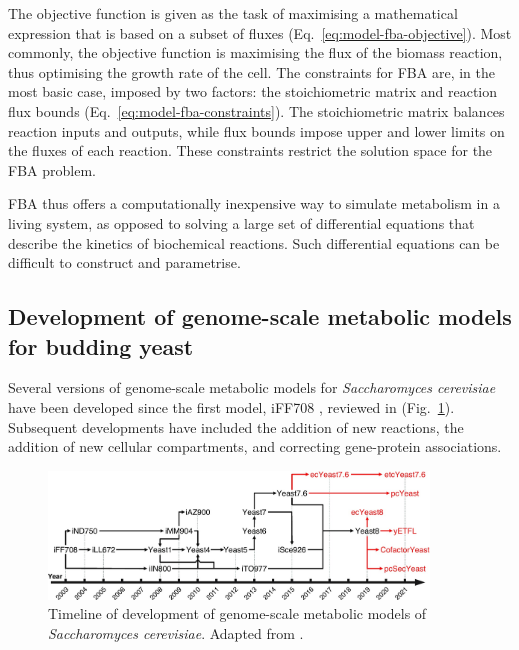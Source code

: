 The objective function is given as the task of maximising a mathematical expression that is based on a subset of fluxes (Eq.\ \ref{eq:model-fba-objective}).
Most commonly, the objective function is maximising the flux of the biomass reaction, thus optimising the growth rate of the cell.
The constraints for FBA are, in the most basic case, imposed by two factors:
the stoichiometric matrix and reaction flux bounds (Eq.\ \ref{eq:model-fba-constraints}).
The stoichiometric matrix balances reaction inputs and outputs, while flux bounds impose upper and lower limits on the fluxes of each reaction.
These constraints restrict the solution space for the FBA problem.

FBA thus offers a computationally inexpensive way to simulate metabolism in a living system, as opposed to solving a large set of differential equations that describe the kinetics of biochemical reactions.
Such differential equations can be difficult to construct and parametrise.


\subsection{Development of genome-scale metabolic models for budding yeast}
\label{subsec:intro-fba-gemm}

Several versions of genome-scale metabolic models for \textit{Saccharomyces cerevisiae} have been developed since the first model, iFF708 \parencite{forsterGenomeScaleReconstructionSaccharomyces2003}, reviewed in \textcite{chenGenomescaleModelingYeast2022} (Fig.\ \ref{fig:intro-fba-timeline}).
Subsequent developments have included the addition of new reactions, the addition of new cellular compartments, and correcting gene-protein associations.

\begin{figure}[hb!]
  \centering
  \includegraphics[width=0.9\textwidth]{chenGenomescaleModelingYeast2022_1}
  \caption[
    Timeline of development of genome-scale metabolic models of \textit{Saccharomyces cerevisiae}.
  ]{
    Timeline of development of genome-scale metabolic models of \textit{Saccharomyces cerevisiae}.
    Adapted from \textcite{chenGenomescaleModelingYeast2022}.
    }
  \label{fig:intro-fba-timeline}
\end{figure}

